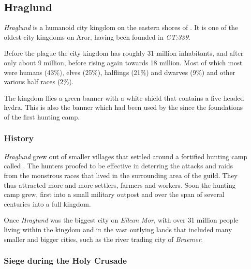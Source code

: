 \subsection{Hraglund}
\label{sec:Hraglund}

\emph{Hraglund} is a humanoid city kingdom on the eastern shores of
. It is one of the oldest city kingdoms on Aror,
having been founded in \emph{GT:339}.

Before the plague the city kingdom has roughly 31 million inhabitants, and
after only about 9 million, before rising again towards 18 million. Most of
which most were humans (43\%), elves (25\%), halflings (21\%) and dwarves
(9\%) and other various half races (2\%).

The kingdom flies a green banner with a white shield that contains a five
headed hydra. This is also the banner which had been used by the
 since the foundations of the first hunting camp.

\subsubsection{History}

\emph{Hraglund} grew out of smaller villages that settled around a fortified
hunting camp called . The hunters proofed to be
effective in deterring the attacks and raids from the monstrous races that
lived in the surrounding area of the guild. They thus attracted more and more
settlers, farmers and workers. Soon the hunting camp grew, first into a small
military outpost and over the span of several centuries into a full kingdom.

Once \emph{Hraglund} was the biggest city on \emph{Eilean Mor}, with over
31 million people living within the kingdom and in the vast outlying lands
that included many smaller and bigger cities, such as the river trading city
of \emph{Braemer}.

\subsubsection{Siege during the Holy Crusade}
\label{sec:Siege of Hraglund}

